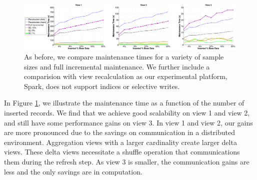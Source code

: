 \begin{figure}[ht!]
\label{exp6conviva}
\hspace{-1em}
\includegraphics[scale=0.18]{exp/exp5-efficiency-conviva-woutlier.eps}
 \caption{As before, we compare maintenance times for a variety of sample sizes and full incremental maintenance. We further include a comparision with view recalculation as our experimental platform, Spark, does not support indices or selective writes.}
\end{figure}

In Figure \ref{exp6conviva}, we illustrate the maintenance time as a function of the number of inserted records.
We find that we achieve good scalability on view 1 and view 2, and still have some performance gains on view 3.
In view 1 and view 2, our gains are more pronounced due to the savings on communication in a distributed environment.
Aggregation views with a larger cardinality create larger delta views.
These delta views necessitate a shuffle operation that communications them during the refresh step.
As view 3 is smaller, the communication gains are less and the only savings are in computation.




